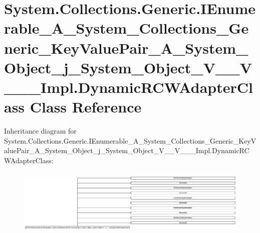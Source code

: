 \hypertarget{class_system_1_1_collections_1_1_generic_1_1_i_enumerable___a___system___collections___generic__18f500256b2622d9de5a4e9c249dbf88}{}\section{System.\+Collections.\+Generic.\+I\+Enumerable\+\_\+\+A\+\_\+\+System\+\_\+\+Collections\+\_\+\+Generic\+\_\+\+Key\+Value\+Pair\+\_\+\+A\+\_\+\+System\+\_\+\+Object\+\_\+j\+\_\+\+System\+\_\+\+Object\+\_\+\+V\+\_\+\+\_\+\+V\+\_\+\+\_\+\+\_\+\+Impl.\+Dynamic\+R\+C\+W\+Adapter\+Class Class Reference}
\label{class_system_1_1_collections_1_1_generic_1_1_i_enumerable___a___system___collections___generic__18f500256b2622d9de5a4e9c249dbf88}
Inheritance diagram for System.\+Collections.\+Generic.\+I\+Enumerable\+\_\+\+A\+\_\+\+System\+\_\+\+Collections\+\_\+\+Generic\+\_\+\+Key\+Value\+Pair\+\_\+\+A\+\_\+\+System\+\_\+\+Object\+\_\+j\+\_\+\+System\+\_\+\+Object\+\_\+\+V\+\_\+\+\_\+\+V\+\_\+\+\_\+\+\_\+\+Impl.\+Dynamic\+R\+C\+W\+Adapter\+Class\+:\begin{figure}[H]
\begin{center}
\leavevmode
\includegraphics[height=3.191710cm]{class_system_1_1_collections_1_1_generic_1_1_i_enumerable___a___system___collections___generic__18f500256b2622d9de5a4e9c249dbf88}
\end{center}
\end{figure}
